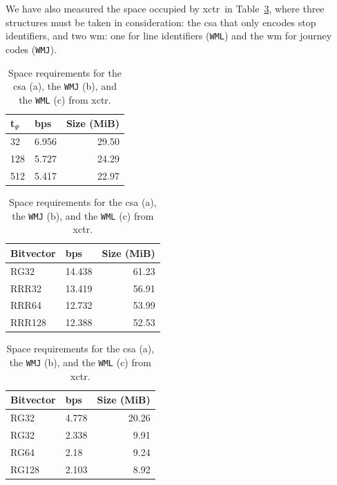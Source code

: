     We have also measured the space occupied by \gls{xctr}~in Table~\ref{tab:ctr}, where three structures must be taken in consideration: the \gls{csa} that only encodes stop identifiers, and two \gls{wm}: one for line identifiers (\texttt{WML}) and the \gls{wm} for journey codes (\texttt{WMJ}).
    
    \begin{table}[ht]
        \begin{subtable}[t]{.35\linewidth}
        \vspace{-12pt}
        \caption{}
        \begin{tabular}[t]{|l|l|r|}
            \hline
            t$_\Psi$ & bps & Size (MiB) \\
             \hline
            32 & 6.956 & 29.50 \\
            128 & 5.727 & 24.29 \\
            512 & 5.417 & 22.97 \\
            \hline
        \end{tabular}
        \end{subtable}
        \begin{subtable}[t]{.5\linewidth}
        \vspace{-12pt}
        \caption{}
        \begin{tabular}[t]{|l|l|r|}
            \hline
            Bitvector & bps & Size (MiB) \\
             \hline
            RG32 & 14.438 & 61.23 \\
            RRR32 & 13.419 & 56.91 \\
            RRR64 & 12.732 & 53.99 \\
            RRR128 & 12.388 & 52.53 \\
            \hline
        \end{tabular}
        \end{subtable}
        \begin{subtable}[t]{.4\linewidth}
        \vspace{-12pt}
        \caption{}
        \begin{tabular}[t]{|l|l|r|}
            \hline
            Bitvector & bps & Size (MiB) \\
             \hline
            RG32 & 4.778 & 20.26 \\
            RG32 & 2.338 & 9.91 \\
            RG64 & 2.18 & 9.24 \\
            RG128 & 2.103 & 8.92 \\
            \hline
        \end{tabular}
        \end{subtable}%
        
        \caption{Space requirements for the \acrshort{csa} (a), the \texttt{WMJ} (b), and the \texttt{WML} (c) from \acrshort{xctr}.}
        \label{tab:ctr}
    \end{table}
    
